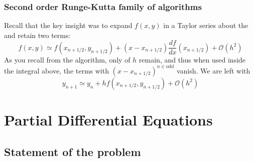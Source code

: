 \documentclass[hyperref={colorlinks=true}]{beamer}
\begin{document}

\begin{frame}%
  \frametitle{Second order Runge-Kutta family of algorithms} 

  Recall that the key insight was to expand $f(x,y)$ in a Taylor series about the  and retain two
terms:
  \begin{equation}
    f(x,y) \simeq f(x_{n+1/2} , y_{n+1/2}) + (x - x_{n+1/2}) \frac{df}{dx}(x_{n+1/2}) + \mathcal{O}(h^2)
  \end{equation}
  As you recall from the  algorithm, only  of $h$ remain, and thus when used inside the integral above, the terms with $(x - x_{n+1/2})^{n\in\mathrm{odd}}$ vanish. We are left with
  \begin{equation}
    y_{n+1} \simeq y_{n} + h f(x_{n+1/2} , y_{n+1/2}) + \mathcal{O}(h^2) 
  \end{equation}
  
  \centering \Large {}

\end{frame}

\section[Partial Differential Equations]{Partial Differential Equations}

\subsection[Statement of the problem]{Statement of the problem}
\end{document}
